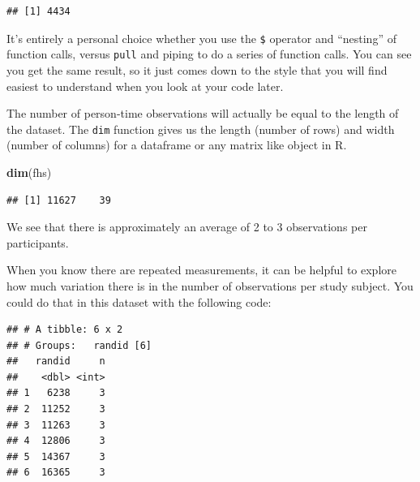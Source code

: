 \documentclass[
]{book}
\newenvironment{Shaded}{\begin{snugshade}}{\end{snugshade}}
\newcommand{\CommentTok}[1]{\textcolor[rgb]{0.56,0.35,0.01}{\textit{#1}}}
\newcommand{\KeywordTok}[1]{\textcolor[rgb]{0.13,0.29,0.53}{\textbf{#1}}}
\newcommand{\NormalTok}[1]{#1}
\newcommand{\OperatorTok}[1]{\textcolor[rgb]{0.81,0.36,0.00}{\textbf{#1}}}
\newcommand{\StringTok}[1]{\textcolor[rgb]{0.31,0.60,0.02}{#1}}
\begin{document}
\begin{verbatim}
## [1] 4434
\end{verbatim}

It's entirely a personal choice whether you use the \texttt{\$} operator and ``nesting''
of function calls, versus \texttt{pull} and piping to do a series of function calls.
You can see you get the same result, so it just comes down to the style that
you will find easiest to understand when you look at your code later.

The number of person-time observations will actually be equal to the length of the dataset.
The \texttt{dim} function gives us the length (number of rows) and width (number of columns) for a dataframe or any matrix like object in R.

\begin{Shaded}
\begin{Highlighting}[]
\KeywordTok{dim}\NormalTok{(fhs)}
\end{Highlighting}
\end{Shaded}

\begin{verbatim}
## [1] 11627    39
\end{verbatim}

We see that there is approximately an average of 2 to 3 observations per participants.

When you know there are repeated measurements, it can be helpful to explore
how much variation there is in the number of observations per study subject.
You could do that in this dataset with the following code:

\begin{Shaded}
\end{Shaded}

\begin{verbatim}
## # A tibble: 6 x 2
## # Groups:   randid [6]
##   randid     n
##    <dbl> <int>
## 1   6238     3
## 2  11252     3
## 3  11263     3
## 4  12806     3
## 5  14367     3
## 6  16365     3
\end{verbatim}
\end{document}

